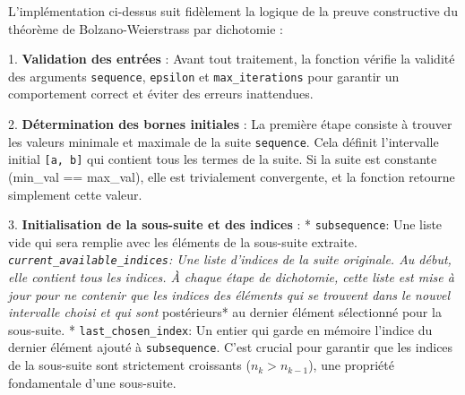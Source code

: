 \documentclass{report}
\begin{document}
L'implémentation ci-dessus suit fidèlement la logique de la preuve constructive du théorème de Bolzano-Weierstrass par dichotomie :

1.  \textbf{Validation des entrées} : Avant tout traitement, la fonction vérifie la validité des arguments \texttt{sequence}, \texttt{epsilon} et \texttt{max\_iterations} pour garantir un comportement correct et éviter des erreurs inattendues.

2.  \textbf{Détermination des bornes initiales} : La première étape consiste à trouver les valeurs minimale et maximale de la suite \texttt{sequence}. Cela définit l'intervalle initial \texttt{[a, b]} qui contient tous les termes de la suite. Si la suite est constante (min\_val == max\_val), elle est trivialement convergente, et la fonction retourne simplement cette valeur.

3.  \textbf{Initialisation de la sous-suite et des indices} :
    *   \texttt{subsequence}: Une liste vide qui sera remplie avec les éléments de la sous-suite extraite.
    \textit{   \texttt{current\_available\_indices}: Une liste d'indices de la suite originale. Au début, elle contient tous les indices. À chaque étape de dichotomie, cette liste est mise à jour pour ne contenir que les indices des éléments qui se trouvent dans le nouvel intervalle choisi et qui sont }postérieurs* au dernier élément sélectionné pour la sous-suite.
    *   \texttt{last\_chosen\_index}: Un entier qui garde en mémoire l'indice du dernier élément ajouté à \texttt{subsequence}. C'est crucial pour garantir que les indices de la sous-suite sont strictement croissants ($n_k > n_{k-1}$), une propriété fondamentale d'une sous-suite.
\end{document}
